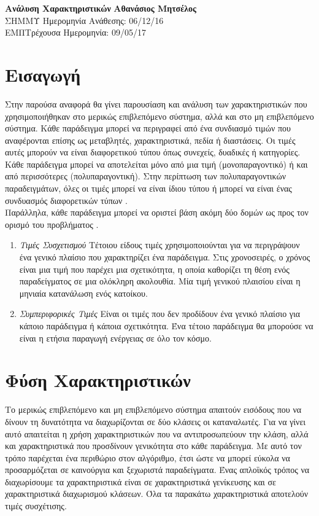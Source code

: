 \documentclass[a4paper, 11pt]{article}
\begin{document}
\noindent
\large\textbf{Ανάλυση Χαρακτηριστικών} \hfill \textbf{Αθανάσιος Μητσέλος} \\
\normalsize ΣΗΜΜΥ \hfill Ημερομηνία Ανάθεσης: 06/12/16  \\
ΕΜΠ\hfill Τρέχουσα Ημερομηνία: 09/05/17 \\


\section{Εισαγωγή}
Στην παρούσα αναφορά θα γίνει παρουσίαση και ανάλυση των χαρακτηριστικών που χρησιμοποιήθηκαν στο μερικώς επιβλεπόμενο σύστημα, αλλά και στο μη επιβλεπόμενο σύστημα. Κάθε παράδειγμα μπορεί να περιγραφεί από ένα συνδιασμό τιμών που αναφέρονται επίσης ως μεταβλητές, χαρακτηριστικά, πεδία ή διαστάσεις. Οι τιμές αυτές μπορούν να είναι διαφορετικού τύπου όπως συνεχείς, δυαδικές ή κατηγορίες. Κάθε παράδειγμα μπορεί να αποτελείται μόνο από μια τιμή (μονοπαραγοντικό) ή και από περισσότερες (πολυπαραγοντική). Στην περίπτωση των πολυπαραγοντικών παραδειγμάτων, όλες οι τιμές μπορεί να είναι ίδιου τύπου ή μπορεί να είναι ένας συνδυασμός διαφορετικών τύπων \cite{Anomaly}.\\
Παράλληλα, κάθε παράδειγμα μπορεί να οριστεί βάση ακόμη δύο δομών ως προς τον ορισμό του προβλήματος \cite{Anomaly}.
\begin{enumerate}
\item{\textit{Τιμές Συσχετισμού}} Τέτοιου είδους τιμές χρησιμοποιούνται για να περιγράψουν ένα γενικό πλαίσιο που χαρακτηρίζει ένα παράδειγμα. Στις χρονοσειρές, ο χρόνος είναι μια τιμή που παρέχει μια σχετικότητα, η οποία καθορίζει τη θέση ενός παραδείγματος σε μια ολόκληρη ακολουθία. Μία τιμή γενικού πλαισίου είναι η μηνιαία κατανάλωση ενός κατοίκου.
\item{\textit{Συμπεριφορικές Τιμές}} Είναι οι τιμές που δεν προδίδουν ένα γενικό πλαίσιο για κάποιο παράδειγμα ή κάποια σχετικότητα. Ένα τέτοιο παράδειγμα θα μπορούσε να είναι η ετήσια παραγωγή ενέργειας σε όλο τον κόσμο.
\end{enumerate}

\section{Φύση Χαρακτηριστικών}
Το μερικώς επιβλεπόμενο και μη επιβλεπόμενο σύστημα απαιτούν εισόδους που να δίνουν τη δυνατότητα να διαχωρίζονται σε δύο κλάσεις οι καταναλωτές. Για να γίνει αυτό απαιτείται η χρήση χαρακτηριστικών που να αντιπροσωπεύουν την κλάση, αλλά και χαρακτηριστικά που προσδίνουν γενικότητα στο κάθε παράδειγμα. Με αυτό τον τρόπο παρέχεται ένα περιθώριο στον αλγόριθμο, έτσι ώστε να μπορεί εύκολα να προσαρμόζεται σε καινούργια και ξεχωριστά παραδείγματα. Ένας απλοϊκός τρόπος να διαχωρίσουμε τα χαρακτηριστικά είναι σε χαρακτηριστικά γενίκευσης και σε χαρακτηριστικά διαχωρισμού κλάσεων. Όλα τα παρακάτω χαρακτηριστικά αποτελούν τιμές συσχέτισης.
\end{document}
